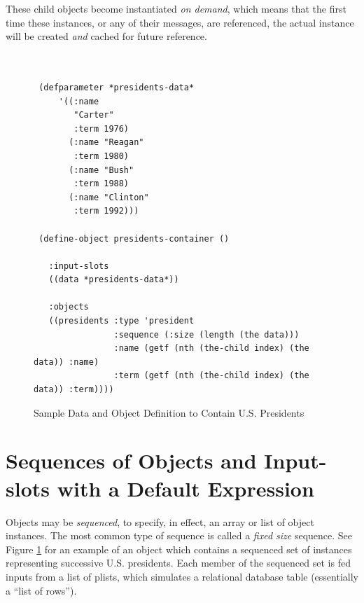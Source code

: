\documentclass [11pt]{book}
\begin{document}
These child objects become instantiated \emph{on demand}, which means that the first time these instances, or any of their messages,
are referenced, the actual instance will be created \emph{and} cached for future reference.
\begin{figure}
\begin{lrbox}{\boxedverb}
\begin{minipage}{\linewidth}

\begin{verbatim}


 (defparameter *presidents-data*
     '((:name 
        "Carter"
        :term 1976)
       (:name "Reagan"
        :term 1980)
       (:name "Bush"
        :term 1988)
       (:name "Clinton"
        :term 1992)))
       
 (define-object presidents-container ()

   :input-slots
   ((data *presidents-data*))

   :objects
   ((presidents :type 'president
                :sequence (:size (length (the data)))
                :name (getf (nth (the-child index) (the data)) :name)
                :term (getf (nth (the-child index) (the data)) :term))))

\end{verbatim}
\end{minipage}
\end{lrbox}
\fbox{\usebox{\boxedverb}}

\caption{Sample Data and Object Definition to Contain U.S. Presidents}

\label{fig:object-presidents-container}

\end{figure}


\section{Sequences of Objects and Input-slots with a Default Expression}

\label{sec:sequencesofobjectsandinput-slotswithadefaultexpression}

Objects may be \emph{sequenced}, to specify, in effect, an array or list of object instances. The most
common type of sequence is called a \emph{fixed size} sequence. See Figure 
\ref{fig:object-presidents-container} for an example of an object which contains a sequenced set
of instances representing successive U.S. presidents. Each member of
the sequenced set is fed inputs from a list of plists, which simulates
a relational database table (essentially a ``list of rows'').
        
\end{document}
